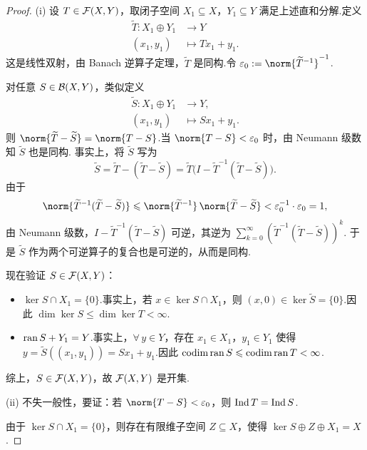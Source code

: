 \begin{proof}
(i) 设 $T\in\mathcal{F}(X,Y)$，取闭子空间 $X_1\subseteq X$，$Y_1\subseteq Y$ 满足上述直和分解.定义
\begin{align*}
\widetilde{T}: X_1\oplus Y_1&\to Y\\[-6pt]
(x_1, y_1)&\mapsto Tx_1 + y_1.
\end{align*}
这是线性双射，由 Banach 逆算子定理，$\widetilde{T}$ 是同构.令 $\varepsilon_0 := \norm{\widetilde{T}^{-1}}^{-1}$.\par
对任意 $S\in\mathcal{B}(X,Y)$，类似定义
\begin{align*}
\widetilde{S}: X_1\oplus Y_1&\to Y,\\[-6pt]
(x_1, y_1)&\mapsto Sx_1 + y_1.
\end{align*}
则 $\norm{\widetilde{T} - \widetilde{S}} = \norm{T - S}$.当 $\norm{T - S}<\varepsilon_0$ 时，由 Neumann 级数知 $\widetilde{S}$ 也是同构. 事实上，将 $\widetilde{S}$ 写为
    \begin{equation*}
    \widetilde{S} = \widetilde{T} - (\widetilde{T} - \widetilde{S}) = \widetilde{T}\bigl(I - \widetilde{T}^{-1}(\widetilde{T} - \widetilde{S})\bigr).
    \end{equation*}
    由于
    \begin{equation*}
    \norm{\widetilde{T}^{-1}(\widetilde{T} - \widetilde{S})} \leq \norm{\widetilde{T}^{-1}}\,\norm{\widetilde{T} - \widetilde{S}} < \varepsilon_0^{-1}\cdot\varepsilon_0 = 1,
    \end{equation*}
    由 Neumann 级数，$I - \widetilde{T}^{-1}(\widetilde{T} - \widetilde{S})$ 可逆，其逆为 $\sum_{k=0}^\infty (\widetilde{T}^{-1}(\widetilde{T} - \widetilde{S}))^k$. 于是 $\widetilde{S}$ 作为两个可逆算子的复合也是可逆的，从而是同构.\par
现在验证 $S\in\mathcal{F}(X,Y)$：
\begin{itemize}
    \item $\ker S\cap X_1 = \{0\}$.事实上，若 $x\in\ker S\cap X_1$，则 $(x,0)\in\ker\widetilde{S} = \{0\}$.因此 $\dim\ker S\leq\dim\ker T<\infty$.
    \item $\operatorname{ran} S + Y_1 = Y$.事实上，$\forall\,y\in Y$，存在 $x_1\in X_1$，$y_1\in Y_1$ 使得 $y = \widetilde{S}((x_1,y_1)) = Sx_1 + y_1$.因此 $\operatorname{codim}\operatorname{ran} S\leqslant\operatorname{codim}\operatorname{ran} T<\infty$.
\end{itemize}
综上，$S\in\mathcal{F}(X,Y)$，故 $\mathcal{F}(X,Y)$ 是开集.\par
(ii) 不失一般性，要证：若 $\norm{T-S}<\varepsilon_0$，则 $\operatorname{Ind} T = \operatorname{Ind} S$.\par
由于 $\ker S \cap X_1 = \{0\}$，则存在有限维子空间 $Z \subseteq X$，使得 $\ker S \oplus Z \oplus X_1 = X$.

\end{proof}
